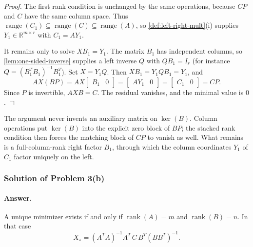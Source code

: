 \documentclass[11pt,a4paper]{article}
\DeclareMathOperator{\rank}{rank}
\begin{document}
\begin{proof}
The first rank condition is unchanged by the same operations, because \(CP\) and \(C\) have the same column space. Thus \(\operatorname{range}(C_{1})\subseteq\operatorname{range}(C)\subseteq\operatorname{range}(A)\), so \cref{def:left-right-mult}(i) supplies \(Y_{1}\in\mathbb{R}^{m\times r}\) with \(C_{1}=AY_{1}\).

It remains only to solve \(XB_{1}=Y_{1}\). The matrix \(B_{1}\) has independent columns, so \cref{lem:one-sided-inverse} supplies a left inverse \(Q\) with \(QB_{1}=I_{r}\) (for instance \(Q=(B_{1}^{T}B_{1})^{-1}B_{1}^{T}\)). Set \(X=Y_{1}Q\). Then \(XB_{1}=Y_{1}QB_{1}=Y_{1}\), and
\[
AX(BP)
=
AX\begin{bmatrix} B_{1} & 0 \end{bmatrix}
=
\begin{bmatrix} AY_{1} & 0 \end{bmatrix}
=
\begin{bmatrix} C_{1} & 0 \end{bmatrix}
=
CP.
\]
Since \(P\) is invertible, \(AXB=C\). The residual vanishes, and the minimal value is \(0\).
\end{proof}

The argument never invents an auxiliary matrix on \(\ker(B)\). Column operations put \(\ker(B)\) into the explicit zero block of \(BP\); the stacked rank condition then forces the matching block of \(CP\) to vanish as well. What remains is a full-column-rank right factor \(B_{1}\), through which the column coordinates \(Y_{1}\) of \(C_{1}\) factor uniquely on the left.

\subsubsection{Solution of Problem 3(b)}

\paragraph{Answer.}
A unique minimizer exists if and only if \(\rank(A)=m\) and \(\rank(B)=n\). In that case
\[
X_{\star}
=
(A^{T}A)^{-1}A^{T}\,C\,B^{T}(BB^{T})^{-1}.
\]
\end{document}
